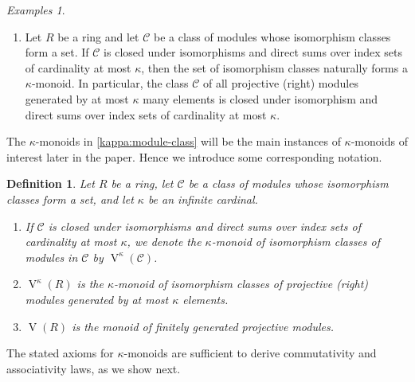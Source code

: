 \documentclass[a4paper,11pt,oneside]{amsart}
\newtheorem{defi}[teor]{Definition}
\theoremstyle{remark}
\newtheorem{examples}[teor]{Examples}
\DeclarePairedDelimiter{\card}{\lvert}{\rvert}
\DeclareMathOperator{\Vmon}{V}
\begin{document}
\begin{examples}
\begin{enumerate}
    If $\kappa$ is an infinite cardinal, and $\alpha_i \le \kappa$ for all $i \in I$ as well as $\card{I} \le \kappa$, then $\sum_{i \in I} \alpha_i \le \kappa$.
    Thus the set $F_\kappa \coloneqq \{\, \alpha : \alpha \le \kappa \,\}$ of all cardinals bounded by $\kappa$ is naturally a $\kappa$-monoid.

  \item \label{kappa:module-class}
    Let $R$ be a ring and let $\mathcal C$ be a class of modules whose isomorphism classes form a set.
If $\mathcal C$ is closed under isomorphisms and direct sums over index sets of cardinality at most $\kappa$, then the set of isomorphism classes naturally forms a $\kappa$-monoid.
In particular, the class $\mathcal C$ of all projective (right) modules generated by at most $\kappa$ many elements is closed under isomorphism and direct sums over index sets of cardinality at most $\kappa$.
  \end{enumerate}
\end{examples}

The $\kappa$-monoids in \ref{kappa:module-class} will be the main instances of $\kappa$-monoids of interest later in the paper.
Hence we introduce some corresponding notation.

\begin{defi} \label{def:vmon}
  Let $R$ be a ring, let $\mathcal C$ be a class of modules whose isomorphism classes form a set, and let $\kappa$ be an infinite cardinal.
  \begin{enumerate}
  \item
    If $\mathcal C$ is closed under isomorphisms and direct sums over index sets of cardinality at most $\kappa$, we denote the $\kappa$-monoid of isomorphism classes of modules in $\mathcal C$ by $\Vmon^{\kappa}(\mathcal C)$.

  \item $\Vmon^{\kappa}(R)$ is the $\kappa$-monoid of isomorphism classes of projective \textup(right\textup) modules generated by at most $\kappa$ elements.

  \item $\Vmon(R)$ is the monoid of finitely generated projective modules. 
  \end{enumerate}
\end{defi}

The stated axioms for $\kappa$-monoids are sufficient to derive commutativity and associativity laws, as we show next.
\end{document}
